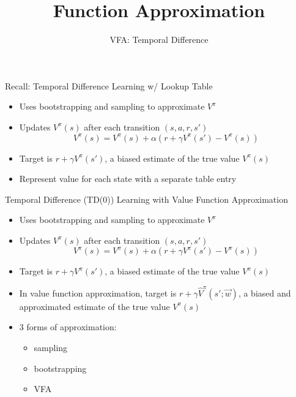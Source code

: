 \documentclass[aspectratio=169]{../latex_main/tntbeamer}  %
\title[RL: Function Approximation]{Function Approximation}
\subtitle{VFA: Temporal Difference}
\begin{document}
	
	\maketitle

\begin{frame}[c]{Recall: Temporal Difference Learning w/ Lookup Table}
	
	\begin{itemize}
		\item Uses bootstrapping and sampling to approximate $V^\pi$
		\item Updates $V^\pi(s)$ after each transition $(s,a,r,s')$
		$$V^\pi(s) = V^\pi (s) + \alpha(r + \gamma V^\pi (s') - V^\pi(s)) $$
		\item Target is $r + \gamma V^\pi(s')$, a biased estimate of the true value $V^\pi(s)$
		\item Represent value for each state with a separate \alert{table entry}
	\end{itemize}

\end{frame}
\begin{frame}[c]{Temporal Difference (TD(0)) Learning with Value
		Function Approximation}
	
	\begin{itemize}
		\item Uses bootstrapping and sampling to approximate $V^\pi$
		\item Updates $V^\pi(s)$ after each transition $(s,a,r,s')$
		$$V^\pi(s) = V^\pi (s) + \alpha(r + \gamma V^\pi (s') - V^\pi(s)) $$
		\item Target is $r + \gamma V^\pi(s')$, a biased estimate of the true value $V^\pi(s)$
		\item In value \alert{function approximation}, target is $r + \gamma \hat{V}^\pi (s'; \vec{w})$, a biased and approximated estimate of the true value $V^\pi(s)$
		\item 3 forms of approximation: 
		\begin{itemize}
			\item sampling
			\item bootstrapping
			\item VFA
		\end{itemize}
	\end{itemize}
	
\end{frame}
\end{document}
